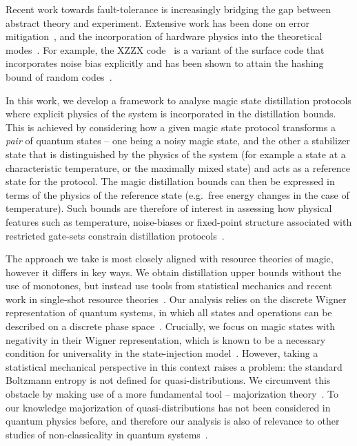 \documentclass[pra,
aps,
twocolumn,
superscriptaddress,
groupedaddress,
nofootinbib,
reprint
]{revtex4-1}
\begin{document}
Recent work towards fault-tolerance is increasingly bridging the gap between abstract theory and experiment. Extensive work has been done on error mitigation~\cite{jones_2012, Li_2017, Temme_2017, Endo_2018, McClean_2017}, and the incorporation of hardware physics into the theoretical modes~\cite{Kandala_2019, holmes_resource_2019, Colless_2018, song2018quantum, Bravyi_2021}. For example, the XZZX code~\cite{bonilla_ataides_xzzx_2021} is a variant of the surface code that incorporates noise bias explicitly and has been shown to attain the hashing bound of random codes~\cite{Bennett_1996}. 

In this work, we develop a framework to analyse magic state distillation protocols where explicit physics of the system is incorporated in the distillation bounds. This is achieved by considering how a given magic state protocol transforms a \emph{pair} of quantum states -- one being a noisy magic state, and the other a stabilizer state that is distinguished by the physics of the system (for example a state at a characteristic temperature, or the maximally mixed state) and acts as a reference state for the protocol. The magic distillation bounds can then be expressed in terms of the physics of the reference state (e.g.~free energy changes in the case of temperature). Such bounds are therefore of interest in assessing how physical features such as temperature, noise-biases or fixed-point structure associated with restricted gate-sets constrain distillation protocols~\cite{Tuckett_2019, Aliferis_2008, Stephens_2013, Li_2015, Babbush_2018, Guillaud_2019, Fowler_2019}.

The approach we take is most closely aligned with resource theories of magic, however it differs in key ways. We obtain distillation upper bounds without the use of monotones, but instead use tools from statistical mechanics and recent work in single-shot resource theories~\cite{cit:janzing, cit:horodecki2, Brandao_2015, Vinjanampathy_2016, Goold_2016, cit:lostaglio, cit:gour}. Our analysis relies on the discrete Wigner representation of quantum systems, in which all states and operations can be described on a discrete phase space~\cite{Ferrie_2008, Okay_2021}. Crucially, we focus on magic states with negativity in their Wigner representation, which is known to be a necessary condition for universality in the state-injection model~\cite{cit:veitch, cit:mari, cit:gottesman, cit:knill, Campbell_2011}. However, taking a statistical mechanical perspective in this context raises a problem: the standard Boltzmann entropy is not defined for quasi-distributions. We circumvent this obstacle by making use of a more fundamental tool -- majorization theory~\cite{cit:marshall, Veinott_1971, Ruch_1976}. To our knowledge majorization of quasi-distributions has not been considered in quantum physics before, and therefore our analysis is also of relevance to other studies of non-classicality in quantum systems~\cite{Fine_1982, Allahverdyan_2018, arvidsson_2020, halpern_2018, Lostaglio_2018, Levy_2020}.
\end{document}
